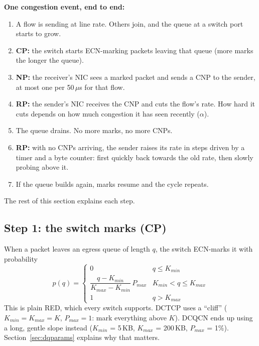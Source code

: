 \textbf{One congestion event, end to end:}
\begin{enumerate}
  \item A flow is sending at line rate. Others join, and the queue at a switch port starts to grow.
  \item \textbf{CP:} the switch starts ECN-marking packets leaving that queue (more marks the longer the queue).
  \item \textbf{NP:} the receiver's NIC sees a marked packet and sends a CNP to the sender, at most one per 50\,$\mu$s for that flow.
  \item \textbf{RP:} the sender's NIC receives the CNP and cuts the flow's rate. How hard it cuts depends on how much congestion it has
        seen recently ($\alpha$).
  \item The queue drains. No more marks, no more CNPs.
  \item \textbf{RP:} with no CNPs arriving, the sender raises its rate in steps driven by a timer and a byte counter: first quickly back towards
        the old rate, then slowly probing above it.
  \item If the queue builds again, marks resume and the cycle repeats.
\end{enumerate}
The rest of this section explains each step.

\subsection{Step 1: the switch marks (CP)}
When a packet leaves an egress queue of length $q$, the switch ECN-marks it with probability
\[
  p(q)=\begin{cases}0 & q\le K_{min}\\[2pt] \dfrac{q-K_{min}}{K_{max}-K_{min}}\,P_{max} & K_{min}<q\le K_{max}\\[6pt] 1 & q>K_{max}\end{cases}
\]
This is plain RED, which every switch supports. DCTCP uses a ``cliff'' ($K_{min}=K_{max}=K$, $P_{max}=1$: mark everything above $K$).
DCQCN ends up using a long, gentle slope instead ($K_{min}$ = 5\,KB, $K_{max}$ = 200\,KB, $P_{max}$ = 1\%). Section~\ref{sec:dqparams}
explains why that matters.

